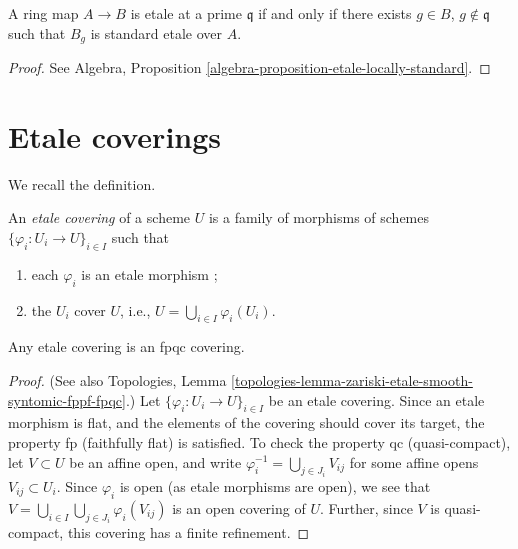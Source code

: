\begin{theorem}
\label{theorem-standard-etale}
A ring map $A \to B$ is etale at a prime $\mathfrak q$ if and only if there
exists $g \in B$, $g \not \in \mathfrak q$ such that $B_g$ is standard
etale over $A$.
\end{theorem}

\begin{proof}
See
Algebra, Proposition \ref{algebra-proposition-etale-locally-standard}.
\end{proof}





\section{Etale coverings}
\label{section-etale-covering}

\noindent
We recall the definition.

\begin{definition}
\label{definition-etale-covering}
An {\it etale covering} of a scheme $U$ is a family of morphisms
of schemes
$\{\varphi_i : U_i \to U\}_{i \in I}$ such that
\begin{enumerate}
\item each $\varphi_i$ is an etale morphism ;
\item the $U_i$ cover $U$, i.e., $U = \bigcup_{i\in I}\varphi_i(U_i)$.
\end{enumerate}
\end{definition}

\begin{lemma}
\label{lemma-etale-fpqc}
Any etale covering is an fpqc covering.
\end{lemma}

\begin{proof}
(See also
Topologies,
Lemma \ref{topologies-lemma-zariski-etale-smooth-syntomic-fppf-fpqc}.)
Let $\{\varphi_i : U_i \to U\}_{i \in I}$ be an etale covering.
Since an etale morphism is flat, and the elements of the covering should
cover its target, the property fp (faithfully flat) is satisfied.
To check the property qc (quasi-compact), let $V \subset U$ be an affine
open, and write $\varphi_i^{-1} = \bigcup_{j \in J_i} V_{ij}$
for some affine opens $V_{ij} \subset U_i$. Since $\varphi_i$ is open
(as etale morphisms are open), we see that
$V = \bigcup_{i\in I} \bigcup_{j \in J_i} \varphi_i(V_{ij})$
is an open covering of $U$.
Further, since $V$ is quasi-compact, this covering has a finite
refinement.
\end{proof}

